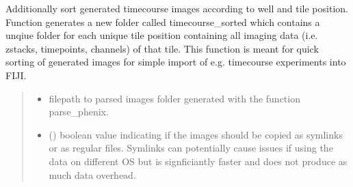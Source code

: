 \documentclass[a4paper,10pt,english,openany,oneside]{sphinxmanual}
\begin{document}

\begin{fulllineitems}
\label{\detokenize{pages/modules:vipertools.parse.sort_timepoints}}
\pysigstartsignatures
{}
\pysigstopsignatures
\sphinxAtStartPar
Additionally sort generated timecourse images according to well and tile position. Function
generates a new folder called timecourse\_sorted which contains a unqiue folder for each unique tile
position containing all imaging data (i.e. zstacks, timepoints, channels) of that tile.
This function is meant for quick sorting of generated images for simple import of e.g. timecourse
experiments into FIJI.
\begin{quote}\begin{description}
\begin{itemize}
\item {} 
\sphinxAtStartPar
{} \textendash{} filepath to parsed images folder generated with the function parse\_phenix.

\item {} 
\sphinxAtStartPar
{} () \textendash{} boolean value indicating if the images should be copied as symlinks or as regular files. Symlinks can potentially cause issues if using the data on
different OS but is signficiantly faster and does not produce as much data overhead.

\end{itemize}

\end{description}\end{quote}

\end{fulllineitems}

\end{document}
